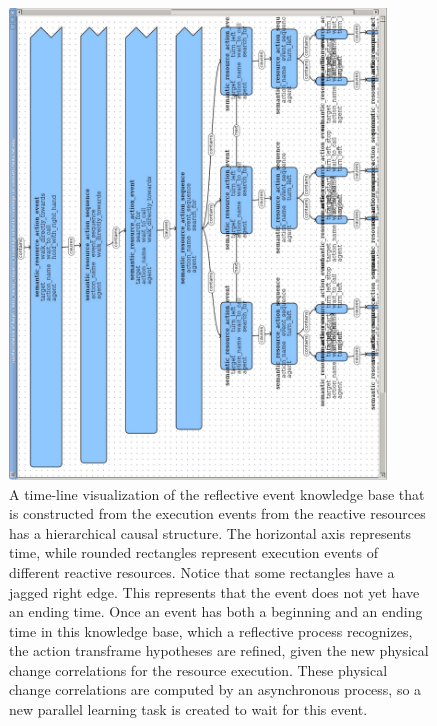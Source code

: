 \begin{figure}
\begin{center}
\includegraphics[width=10cm]{gfx/implemented_reflective_event_knowledge_base}
\end{center}
\caption[A time-line visualization of the reflective event knowledge
  base that is constructed from the execution events from the reactive
  resources.]{A time-line visualization of the reflective event
  knowledge base that is constructed from the execution events from
  the reactive resources has a hierarchical causal structure.  The
  horizontal axis represents time, while rounded rectangles represent
  execution events of different reactive resources.  Notice that some
  rectangles have a jagged right edge.  This represents that the event
  does not yet have an ending time.  Once an event has both a
  beginning and an ending time in this knowledge base, which a
  reflective process recognizes, the action transframe hypotheses are
  refined, given the new physical change correlations for the resource
  execution.  These physical change correlations are computed by an
  asynchronous process, so a new parallel learning task is created to
  wait for this event.}
\label{figure:implemented_reflective_event_knowledge_base}
\end{figure}

